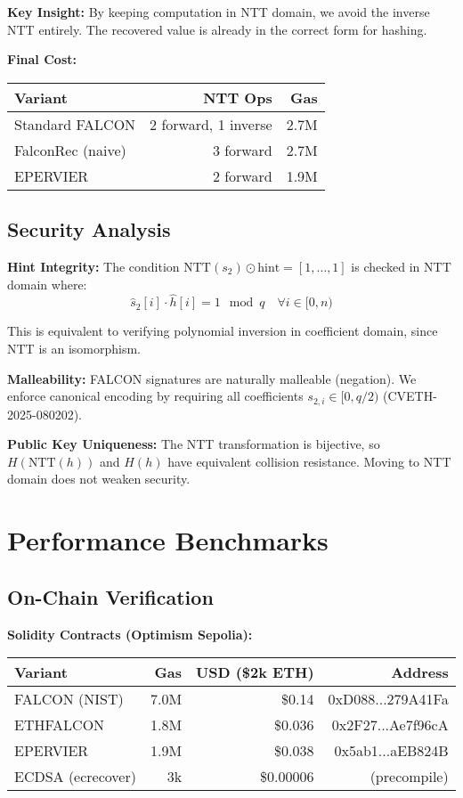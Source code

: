 \documentclass[11pt,a4paper]{article}
\begin{document}
\textbf{Key Insight:} By keeping computation in NTT domain, we avoid the inverse NTT entirely. The recovered value is already in the correct form for hashing.

\textbf{Final Cost:}
\begin{center}
\begin{tabular}{lrr}
\hline
\textbf{Variant} & \textbf{NTT Ops} & \textbf{Gas} \\
\hline
Standard FALCON & 2 forward, 1 inverse & 2.7M \\
FalconRec (naive) & 3 forward & 2.7M \\
EPERVIER & 2 forward & 1.9M \\
\hline
\end{tabular}
\end{center}

\subsection{Security Analysis}

\textbf{Hint Integrity:} The condition $\text{NTT}(s_2) \odot \text{hint} = [1, \ldots, 1]$ is checked in NTT domain where:
\begin{equation}
\hat{s}_2[i] \cdot \hat{h}[i] = 1 \mod q \quad \forall i \in [0, n)
\end{equation}

This is equivalent to verifying polynomial inversion in coefficient domain, since NTT is an isomorphism.

\textbf{Malleability:} FALCON signatures are naturally malleable (negation). We enforce canonical encoding by requiring all coefficients $s_{2,i} \in [0, q/2)$ (CVETH-2025-080202).

\textbf{Public Key Uniqueness:} The NTT transformation is bijective, so $H(\text{NTT}(h))$ and $H(h)$ have equivalent collision resistance. Moving to NTT domain does not weaken security.

\section{Performance Benchmarks}

\subsection{On-Chain Verification}

\textbf{Solidity Contracts (Optimism Sepolia):}
\begin{center}
\begin{tabular}{lrrr}
\hline
\textbf{Variant} & \textbf{Gas} & \textbf{USD (\$2k ETH)} & \textbf{Address} \\
\hline
FALCON (NIST) & 7.0M & \$0.14 & 0xD088...279A41Fa \\
ETHFALCON & 1.8M & \$0.036 & 0x2F27...Ae7f96cA \\
EPERVIER & 1.9M & \$0.038 & 0x5ab1...aEB824B \\
\hline
ECDSA (ecrecover) & 3k & \$0.00006 & (precompile) \\
\hline
\end{tabular}
\end{center}
\end{document}
